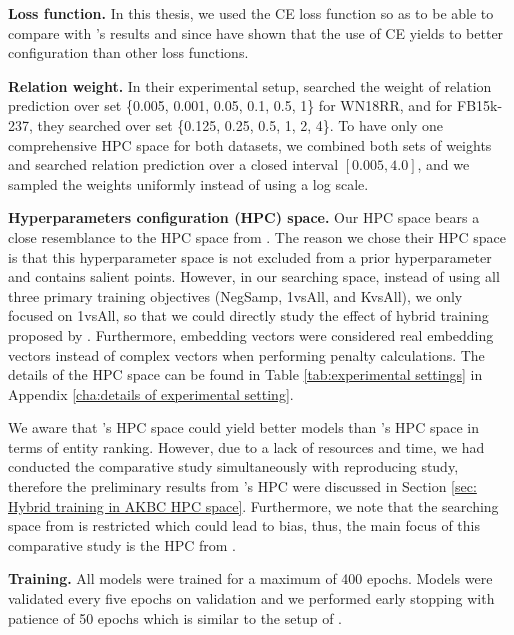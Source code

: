 \noindent\textbf{Loss function.} In this thesis, we used the CE loss function so as to be able to compare with \citet{chen2021relation}'s results and since \citet{Ruffinelli2020You} have shown that the use of CE yields to better configuration than other loss functions. 
\newline

\noindent\textbf{Relation weight.} In their experimental setup, \citet{chen2021relation} searched the weight of relation prediction over set \{0.005, 0.001, 0.05, 0.1, 0.5, 1\} for WN18RR, and for FB15k-237, they searched over set \{0.125, 0.25, 0.5, 1, 2, 4\}. To have only one comprehensive HPC space for both datasets, we combined both sets of weights and searched relation prediction over a closed interval $[0.005, 4.0]$, and we sampled the weights uniformly instead of using a log scale. 
\newline

\noindent\textbf{Hyperparameters configuration (HPC) space.} Our HPC space bears a close resemblance to the HPC space from \citet{Ruffinelli2020You}. The reason we chose their HPC space is that this hyperparameter space is not excluded from a prior hyperparameter and contains salient points. However, in our searching space, instead of using all three primary training objectives (NegSamp, 1vsAll, and KvsAll), we only focused on 1vsAll, so that we could directly study the effect of hybrid training proposed by \citet{chen2021relation}. Furthermore, embedding vectors were considered real embedding vectors instead of complex vectors when performing penalty calculations. The details of the HPC space can be found in Table \ref{tab:experimental settings} in Appendix \ref{cha:details of experimental setting}.

We aware that \citet{chen2021relation}'s HPC space could yield better models than \citet{Ruffinelli2020You}'s HPC space in terms of entity ranking. However, due to a lack of resources and time, we had conducted the comparative study simultaneously with reproducing study, therefore the preliminary results from \cite{chen2021relation}'s HPC were discussed in Section \ref{sec: Hybrid training in AKBC HPC space}. Furthermore, we note that the searching space from \cite{chen2021relation} is restricted which could lead to bias, thus, the main focus of this comparative study is the HPC from \cite{Ruffinelli2020You}.
\newline


\noindent\textbf{Training.} All models were trained for a maximum of 400 epochs. Models were validated every five epochs on validation and we performed early stopping with patience of 50 epochs which is similar to the setup of \citet{Ruffinelli2020You}.
\newline

